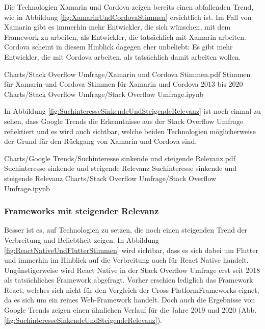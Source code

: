 Die Technologien Xamarin und Cordova zeigen bereits einen abfallenden Trend, wie in Abbildung \ref{fig:XamarinUndCordovaStimmen} ersichtlich ist.
Im Fall von Xamarin gibt es immerhin mehr Entwickler, die sich wünschen, mit dem Framework zu arbeiten, als Entwickler, die tatsächlich mit Xamarin arbeiten.
Cordova scheint in diesem Hinblick dagegen eher unbeliebt: Es gibt mehr Entwickler, die mit Cordova arbeiten, als tatsächlich damit arbeiten wollen.

\begin{alexfigurewithnotebook}{Charts/Stack Overflow Umfrage/Xamarin und Cordova Stimmen.pdf}
	{Stimmen für Xamarin und Cordova}
	{Stimmen für Xamarin und Cordova 2013 bis 2020}
	{Charts/Stack Overflow Umfrage/Stack Overflow Umfrage.ipynb}
	{}
	\label{fig:XamarinUndCordovaStimmen}

\end{alexfigurewithnotebook}


In Abbildung \ref{fig:SuchinteresseSinkendeUndSteigendeRelevanz} ist noch einmal zu sehen, dass Google Trends die Erkenntnisse aus der Stack Overflow Umfrage reflektiert und es wird auch sichtbar, welche beiden Technologien möglicherweise der Grund für den Rückgang von Xamarin und Cordova sind.

\begin{alexfigurewithnotebook}{Charts/Google Trends/Suchinteresse sinkende und steigende Relevanz.pdf}
	{Suchinteresse sinkende und steigende Relevanz}
	{Suchinteresse sinkende und steigende Relevanz}
	{Charts/Stack Overflow Umfrage/Stack Overflow Umfrage.ipynb}
	{}
	\label{fig:SuchinteresseSinkendeUndSteigendeRelevanz}

\end{alexfigurewithnotebook}

\subsubsection{Frameworks mit steigender Relevanz}

Besser ist es, auf Technologien zu setzen, die noch einen steigenden Trend der Verbreitung und Beliebtheit zeigen.
In Abbildung \ref{fig:ReactNativeUndFlutterStimmen} wird sichtbar, dass es sich dabei um Flutter und immerhin im Hinblick auf die Verbreitung auch für React Native handelt.
Ungünstigerweise wird React Native in der Stack Overflow Umfrage erst seit 2018 als tatsächliches Framework abgefragt.
Vorher erschien lediglich das Framework React, welches sich nicht für den Vergleich der Cross-PlatformFrameworks eignet, da es sich um ein reines Web-Framework handelt.
Doch auch die Ergebnisse von Google Trends zeigen einen ähnlichen Verlauf für die Jahre 2019 und 2020 (Abb. \ref{fig:SuchinteresseSinkendeUndSteigendeRelevanz}).

